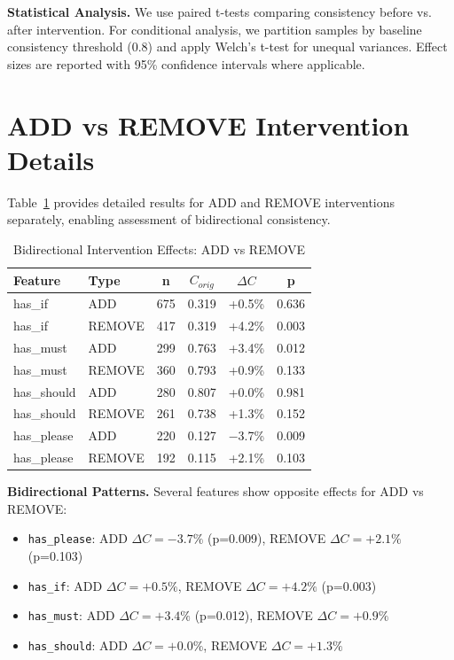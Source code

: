 \documentclass[sigconf,anonymous,review]{acmart}
\begin{document}
\textbf{Statistical Analysis.} We use paired t-tests comparing consistency before vs. after intervention. For conditional analysis, we partition samples by baseline consistency threshold (0.8) and apply Welch's t-test for unequal variances. Effect sizes are reported with 95\% confidence intervals where applicable.

\section{ADD vs REMOVE Intervention Details}
\label{app:add_remove}

Table~\ref{tab:add_remove} provides detailed results for ADD and REMOVE interventions separately, enabling assessment of bidirectional consistency.

\begin{table}[h]
\centering
\caption{Bidirectional Intervention Effects: ADD vs REMOVE}
\label{tab:add_remove}
\small
\begin{tabular}{@{}llcccc@{}}
\toprule
\textbf{Feature} & \textbf{Type} & \textbf{n} & \textbf{$C_{orig}$} & \textbf{$\Delta C$} & \textbf{p} \\
\midrule
has\_if & ADD & 675 & 0.319 & +0.5\% & 0.636 \\
has\_if & REMOVE & 417 & 0.319 & +4.2\% & 0.003 \\
\midrule
has\_must & ADD & 299 & 0.763 & +3.4\% & 0.012 \\
has\_must & REMOVE & 360 & 0.793 & +0.9\% & 0.133 \\
\midrule
has\_should & ADD & 280 & 0.807 & +0.0\% & 0.981 \\
has\_should & REMOVE & 261 & 0.738 & +1.3\% & 0.152 \\
\midrule
has\_please & ADD & 220 & 0.127 & $-$3.7\% & 0.009 \\
has\_please & REMOVE & 192 & 0.115 & +2.1\% & 0.103 \\
\bottomrule
\end{tabular}
\end{table}

\textbf{Bidirectional Patterns.} Several features show opposite effects for ADD vs REMOVE:
\begin{itemize}
    \item \texttt{has\_please}: ADD $\Delta C = -3.7\%$ (p=0.009), REMOVE $\Delta C = +2.1\%$ (p=0.103)
    \item \texttt{has\_if}: ADD $\Delta C = +0.5\%$, REMOVE $\Delta C = +4.2\%$ (p=0.003)
    \item \texttt{has\_must}: ADD $\Delta C = +3.4\%$ (p=0.012), REMOVE $\Delta C = +0.9\%$
    \item \texttt{has\_should}: ADD $\Delta C = +0.0\%$, REMOVE $\Delta C = +1.3\%$
\end{itemize}
\end{document}
